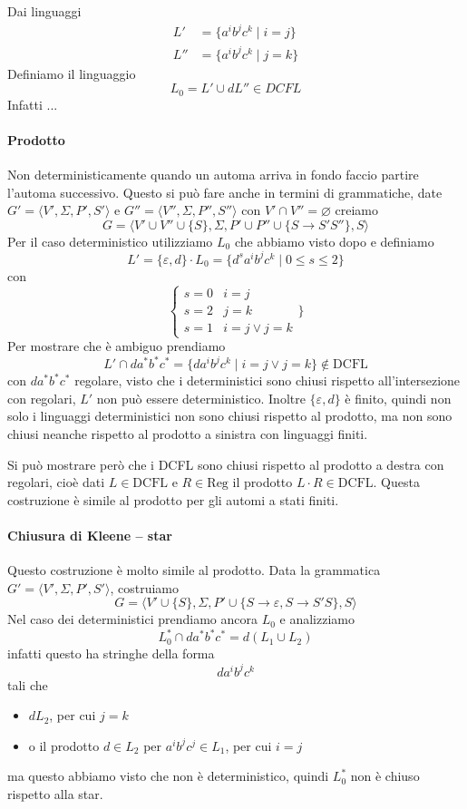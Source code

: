 \documentclass[12pt]{article}
\begin{document}
Dai linguaggi 
\begin{align*}
	L' &= \{ a^i b^j c^k \mid i = j \} \\
	L'' &= \{ a^i b^j c^k \mid j = k \}
\end{align*}
Definiamo il linguaggio 
$$ L_0 = L' \cup dL'' \in DCFL $$
Infatti ...

\paragraph{Prodotto} Non deterministicamente quando un automa arriva in fondo faccio partire l'automa successivo.
Questo si può fare anche in termini di grammatiche, date $G' = \langle V', \Sigma, P', S' \rangle$ e $G'' = \langle V'', \Sigma, P'', S'' \rangle$ con $V' \cap V'' = \varnothing$ creiamo
$$ G = \langle V' \cup V'' \cup \{ S \}, \Sigma, P' \cup P'' \cup \{ S \rightarrow S' S'' \}, S \rangle $$
Per il caso deterministico utilizziamo $L_0$ che abbiamo visto dopo e definiamo
$$ L' = \{ \varepsilon, d \} \cdot L_0 = \{ d^s a^i b^j c^k \mid 0 \leq s \leq 2 \} $$
con 
$$\begin{cases} s = 0 & i = j \\ s = 2 & j = k \\ s = 1 & i = j \vee j = k \end{cases}\} $$
Per mostrare che è ambiguo prendiamo
$$ L' \cap d a^* b^* c^* = \{ d a^i b^j c^k \mid i = j \vee j = k \} \not \in \text{DCFL}$$
con $d a^* b^* c^*$ regolare, visto che i deterministici sono chiusi rispetto all'intersezione con regolari, $L'$ non può essere deterministico.
Inoltre $\{\varepsilon, d\}$ è finito, quindi non solo i linguaggi deterministici non sono chiusi rispetto al prodotto, ma non sono chiusi neanche rispetto al prodotto a sinistra con linguaggi finiti.

Si può mostrare però che i DCFL sono chiusi rispetto al prodotto a destra con regolari, cioè dati $L \in \text{DCFL}$ e $R \in \text{Reg}$ il prodotto $L \cdot R \in \text{DCFL}$.
Questa costruzione è simile al prodotto per gli automi a stati finiti.

\paragraph{Chiusura di Kleene -- star} Questo costruzione è molto simile al prodotto. 
Data la grammatica $G' = \langle V', \Sigma, P', S' \rangle$, costruiamo
$$ G = \langle V' \cup \{ S \}, \Sigma, P' \cup \{ S \rightarrow \varepsilon, S \rightarrow S' S \}, S \rangle $$
Nel caso dei deterministici prendiamo ancora $L_0$ e analizziamo
$$ L_0^* \cap d a^* b^* c^* = d (L_1 \cup L_2) $$
infatti questo ha stringhe della forma
$$ da^ib^jc^k $$
tali che
\begin{itemize}
	\item $dL_2$, per cui $j = k$
	\item o il prodotto $d \in L_2$ per $a^i b^j c^j \in L_1$, per cui $i = j$
\end{itemize}
ma questo abbiamo visto che non è deterministico, quindi $L_0^*$ non è chiuso rispetto alla star.
\end{document}
